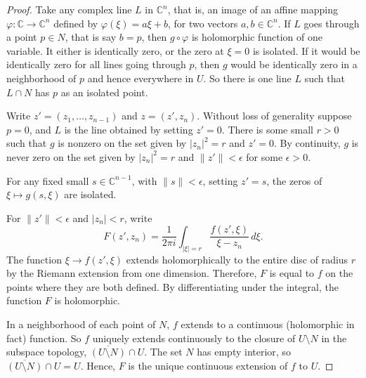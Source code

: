 \documentclass[12pt,openany]{book}
\newcommand{\sabs}[1]{\lvert {#1} \rvert}
\newcommand{\snorm}[1]{\lVert {#1} \rVert}
\newcommand{\abs}[1]{\left\lvert {#1} \right\rvert}
\newcommand{\C}{{\mathbb{C}}}
\theoremstyle{plain}
\theoremstyle{remark}
\theoremstyle{definition}
\theoremstyle{exercise}
\theoremstyle{example}
\newcommand{\exerciseref}[1]{\hyperref[#1]{Exercise~\ref*{#1}}}
\begin{document}
\begin{proof}
Take any complex line $L$ in $\C^n$, that is, an image of an affine mapping
$\varphi \colon \C \to \C^n$ defined by
$\varphi(\xi) = a\xi + b$, for two vectors $a,b \in \C^n$.
If $L$ goes through a point $p \in N$, that is say $b=p$,
then $g \circ \varphi$ is
holomorphic function of one variable.  It either is identically zero, or
the zero at $\xi=0$ is isolated.
If it would be identically zero for all lines going through
$p$, then $g$ would be identically zero in a neighborhood of $p$ and hence
everywhere in $U$.  So there is one line $L$ such that $L \cap N$ has $p$
as an isolated point.

Write $z' =
(z_1,\ldots,z_{n-1})$ and $z=(z',z_n)$.
Without loss of generality suppose $p = 0$, and $L$ is the line
obtained by setting $z' = 0$.
There is some small
$r > 0$ such that $g$ is nonzero on the set
given by $\sabs{z_n}^2 = r$ and $z' = 0$.
By continuity,
$g$ is never zero on the set given by
$\sabs{z_n}^2 = r$ and $\snorm{z'} <\epsilon$ for some $\epsilon >0$.

For any fixed small $s \in \C^{n-1}$, with $\snorm{s} < \epsilon$,
setting $z' = s$,
the zeros of $\xi \mapsto g(s,\xi)$ are isolated.

\begin{center}

\end{center}

For $\snorm{z'} <
\epsilon$ and $\abs{z_n} < r$, write
\begin{equation*}
F(z',z_n) =
\frac{1}{2\pi i}
\int_{\sabs{\xi}=r} \frac{f(z',\xi)}{\xi-z_n} \,d\xi .
\end{equation*}
The function $\xi \to f(z',\xi)$ extends holomorphically to the entire
disc of radius $r$ by the Riemann extension from one dimension.  Therefore,
$F$ is equal to $f$ on the points where they are both defined.
By differentiating under the integral, the function $F$ is holomorphic.

In a neighborhood of each point of 
$N$, $f$ extends to a continuous (holomorphic in fact) function.
So $f$ uniquely extends continuously to the closure of
$U \setminus N$ in the subspace topology,
$\overline{(U \setminus N)} \cap U$.  The set $N$ has empty interior,
so $\overline{(U \setminus N)} \cap U = U$.  Hence, $F$ is the unique
continuous extension of $f$ to $U$.
\end{proof}
\end{document}
